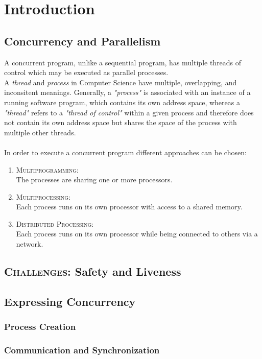 \documentclass{report}
\author{\\ Marcel Matti Zauder}
\begin{document}
	\chapter{Introduction}	
	\section{Concurrency and Parallelism}
	\startsection
		A concurrent program, unlike a sequential program, has multiple threads of control which may be executed as parallel processes. \\
		A \textit{thread} and \textit{process} in Computer Science have multiple, overlapping, and inconsitent meanings. Generally, a \textit{"process"} is associated with an instance of a running software program, which contains its own address space, whereas a \textit{"thread"} refers to a \textit{"thread of control"} within a given process and therefore does not contain its own address space but shares the space of the process with multiple other threads. \\ \\
		In order to execute a concurrent program different approaches can be chosen:
		\begin{enumerate}[-]
			\item \textsc{Multiprogramming}: \\
			The processes are sharing one or more processors.
			\item \textsc{Multiprocessing}: \\
			Each process runs on its own processor with access to a shared memory.
			\item \textsc{Distributed Processing}: \\
			Each process runs on its own processor while being connected to others via a network.
		\end{enumerate}
	\closesection
	\section{\textsc{Challenges}: Safety and Liveness}
	\startsection
	\closesection
	\section{Expressing Concurrency}
	\startsection
		\subsection{Process Creation}
		\startsubsection
		\closesection
		\subsection{Communication and Synchronization}
		\startsubsection
		\closesection
	\closesection
\end{document}
